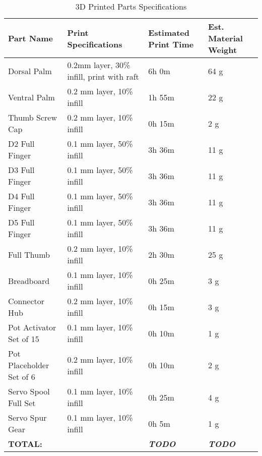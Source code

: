 \begin{table}[H]
\centering
\caption{3D Printed Parts Specifications}
\label{3d_printed_parts_list}
\begin{tabular}{|p{4cm}|p{4cm}|p{2cm}|p{2.5cm}|}
\hline
\textbf{Part Name} & \textbf{Print Specifications} & \textbf{Estimated Print Time} & \textbf{Est. Material Weight} \\ \hline
Dorsal Palm & 0.2mm layer, 30\% infill, print with raft & 6h 0m & 64 g \\ \hline
Ventral Palm & 0.2 mm layer, 10\% infill & 1h 55m & 22 g  \\ \hline
Thumb Screw Cap &0.2 mm layer, 10\% infill &0h 15m &2 g  \\ \hline
D2 Full Finger &0.1 mm layer, 50\% infill &3h 36m &11 g  \\ \hline
D3 Full Finger &0.1 mm layer, 50\% infill &3h 36m &11 g  \\ \hline
D4 Full Finger &0.1 mm layer, 50\% infill &3h 36m &11 g  \\ \hline
D5 Full Finger &0.1 mm layer, 50\% infill &3h 36m &11 g  \\ \hline
Full Thumb &0.2 mm layer, 10\% infill &2h 30m &25 g  \\ \hline
Breadboard &0.1 mm layer, 10\% infill &0h 25m &3 g  \\ \hline
Connector Hub &0.2 mm layer, 10\% infill &0h 15m &3 g  \\ \hline
Pot Activator Set of 15 &0.1 mm layer, 10\% infill &0h 10m &1 g  \\ \hline
Pot Placeholder Set of 6 &0.2 mm layer, 10\% infill &0h 10m &2 g  \\ \hline
Servo Spool Full Set &0.1 mm layer, 10\% infill &0h 25m &4 g  \\ \hline
Servo Spur Gear &0.1 mm layer, 10\% infill &0h 5m &1 g  \\ \hline
\textbf{TOTAL:}&\centering{-}  & \textit{\textbf{TODO}} & \textit{\textbf{TODO}} \\ \hline
\end{tabular}
\end{table} 


